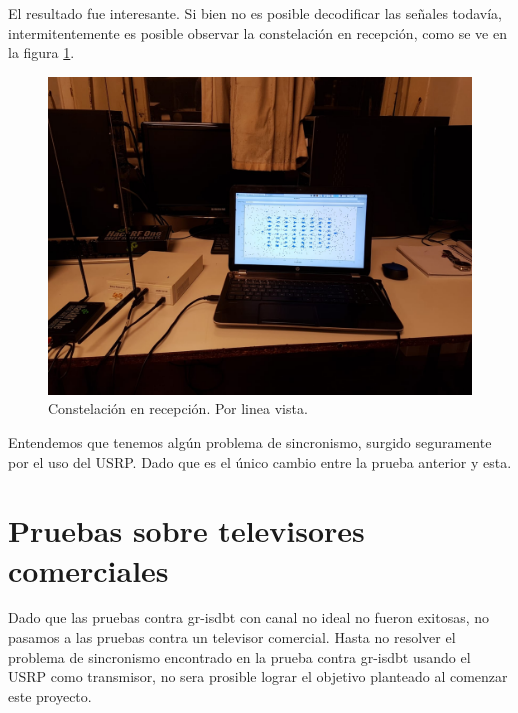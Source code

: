 El resultado fue interesante. Si bien no es posible decodificar las señales todavía, intermitentemente es posible observar la constelación en recepción, como se ve en la figura \ref{f:aire}. 

\begin{figure}[!h]
	\centering
	\includegraphics[scale=0.25]{figuras/cap06/aire}
	\caption{\label{f:aire} Constelación en recepción. Por linea vista.}
\end{figure}

Entendemos que tenemos algún problema de sincronismo, surgido seguramente por el uso del USRP. Dado que es el único cambio entre la prueba anterior y esta. 

\section{Pruebas sobre televisores comerciales}

Dado que las pruebas contra gr-isdbt con canal no ideal no fueron exitosas, no pasamos a las pruebas contra un televisor comercial. Hasta no resolver el problema de sincronismo encontrado en la prueba contra gr-isdbt usando el USRP como transmisor, no sera prosible lograr el objetivo planteado al comenzar este proyecto. 